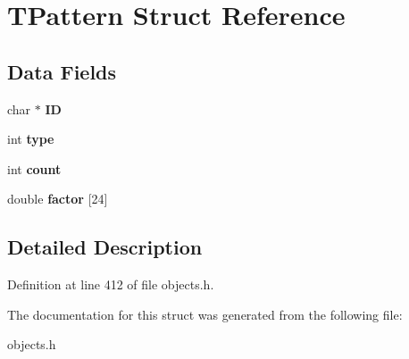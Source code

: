 \hypertarget{struct_t_pattern}{}\section{T\+Pattern Struct Reference}
\label{struct_t_pattern}
\subsection*{Data Fields}
\begin{DoxyCompactItemize}
\item 
\mbox{\label{struct_t_pattern_a63756a4a33a8c806e584babb52907653}} 
char $\ast$ {\bfseries ID}
\item 
\mbox{\label{struct_t_pattern_ac765329451135abec74c45e1897abf26}} 
int {\bfseries type}
\item 
\mbox{\label{struct_t_pattern_ad43c3812e6d13e0518d9f8b8f463ffcf}} 
int {\bfseries count}
\item 
\mbox{\label{struct_t_pattern_a29a003a81fbc7834d56b63a6033687b8}} 
double {\bfseries factor} \mbox{[}24\mbox{]}
\end{DoxyCompactItemize}


\subsection{Detailed Description}


Definition at line 412 of file objects.\+h.



The documentation for this struct was generated from the following file\+:\begin{DoxyCompactItemize}
\item 
objects.\+h\end{DoxyCompactItemize}
